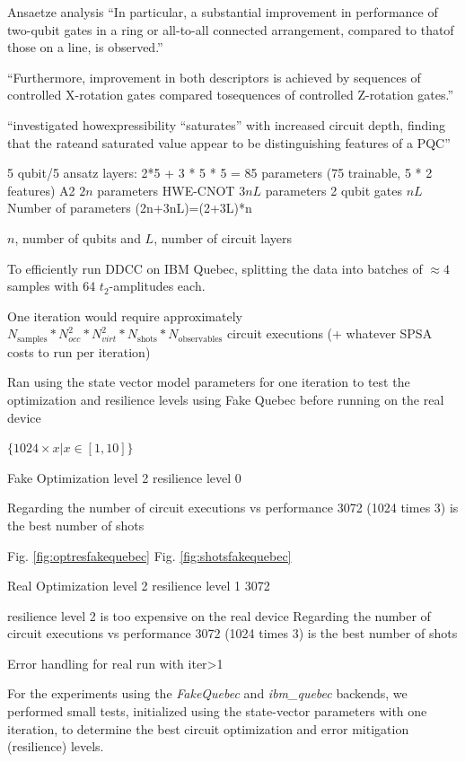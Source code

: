 \documentclass[journal=jacsat,manuscript=article]{achemso}
\begin{document}
Ansaetze analysis \cite{sim_expressibility_2019}
``In particular, a substantial improvement in performance of two-qubit gates in a ring or all-to-all connected arrangement, compared to thatof those on a line, is observed.''

``Furthermore, improvement in both descriptors is achieved by sequences of controlled X-rotation gates compared tosequences of controlled Z-rotation gates.''

``investigated howexpressibility “saturates” with increased circuit depth, finding that the rateand saturated value appear to be distinguishing features of a PQC''



5 qubit/5 ansatz layers: 2*5 + 3 * 5 * 5 = 85 parameters (75 trainable, 5 * 2 features)
A2 $2n$ parameters
HWE-CNOT $3nL$ parameters
2 qubit gates $nL$
Number of parameters (2n+3nL)=(2+3L)*n

$n$, number of qubits and $L$, number of circuit layers

To efficiently run DDCC on IBM Quebec, splitting the data into batches of $\approx 4$ samples with 64 $t_{2}$-amplitudes each.

One iteration would require approximately $N_{\text{samples}} * N_{occ}^{2} * N_{virt}^{2} * N_{\text{shots}} * N_{\text{observables}}$ circuit executions (+ whatever SPSA costs to run per iteration)


Ran using the state vector model parameters for one iteration to test the optimization and resilience levels using Fake Quebec before running on the real device

$\{1024 \times x \vert  x \in [1,10]\}$ 

Fake
Optimization level 2 
resilience level 0

Regarding the number of circuit executions vs performance 3072 (1024 times 3) is the best number of shots


Fig. \ref{fig:optresfakequebec}
Fig. \ref{fig:shotsfakequebec}


Real
Optimization level 2 
resilience level 1
3072

resilience level 2 is too expensive on the real device
Regarding the number of circuit executions vs performance 3072 (1024 times 3) is the best number of shots

Error handling for real run with iter>1

For the experiments using the \textit{FakeQuebec} and \textit{ibm\_quebec} backends, we performed small tests, initialized using the state-vector parameters with one iteration, to determine the best circuit optimization and error mitigation (resilience) levels. 
\end{document}

